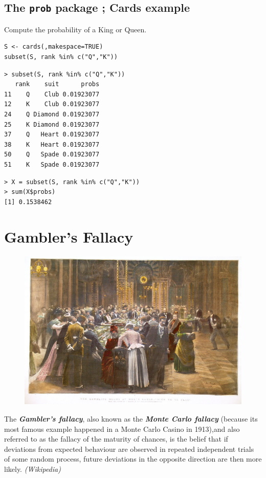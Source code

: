 \documentclass[11pt]{article} %
\begin{document}
\subsection{The \texttt{prob} package ; Cards example}
Compute the probability of a King or Queen.
\begin{framed}
\begin{verbatim}
S <- cards(,makespace=TRUE)
subset(S, rank %in% c("Q","K"))
\end{verbatim}
\end{framed}

\begin{verbatim}
> subset(S, rank %in% c("Q","K"))
   rank    suit      probs
11    Q    Club 0.01923077
12    K    Club 0.01923077
24    Q Diamond 0.01923077
25    K Diamond 0.01923077
37    Q   Heart 0.01923077
38    K   Heart 0.01923077
50    Q   Spade 0.01923077
51    K   Spade 0.01923077
\end{verbatim}

\begin{verbatim}
> X = subset(S, rank %in% c("Q","K"))
> sum(X$probs)
[1] 0.1538462
\end{verbatim}
\newpage

\newpage
\section{Gambler's Fallacy}

\begin{figure}[h!]
\centering
\includegraphics[width=0.7\linewidth]{./Gamblers}
\caption{}
\label{fig:Gamblers}
\end{figure}

The \textbf{\textit{Gambler's fallacy}}, also known as the \textbf{\textit{Monte Carlo fallacy}} (because its most famous example happened in a Monte Carlo Casino in 1913),and also referred to as the fallacy of the maturity of chances, is the belief that if deviations from expected behaviour are observed in repeated independent trials of some random process, future deviations in the opposite direction are then more likely. \textit{(Wikipedia)}
\end{document}

